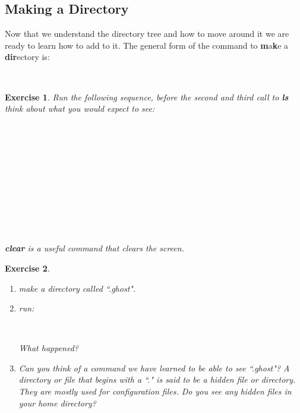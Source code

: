 \documentclass[oneside]{book}
\newcommand{\commandline}[1]{\begin{center} \colorbox{Dark}{\textcolor{white}{#1}} \end{center}}
\newtheorem{ex}{Exercise}[chapter]
\begin{document}
\subsection{Making a Directory}
Now that we understand the directory tree and how to move around it we are ready to learn how to add to it. The general form of the command to \textbf{m}a\textbf{k}e a \textbf{dir}ectory is:
\commandline{mkdir newdirname1 newdirname2 ...}
\begin{ex}
	Run the following sequence, before the second and third call to \textbf{ls} think about what you would expect to see:
\commandline{clear}
\commandline{ls}
\commandline{mkdir FirstDir SecondDir}
\commandline{ls}
\commandline{mkdir FirstDir/Foo FirstDir/Foo2}
\commandline{ls FirstDir}
\textbf{clear} is a useful command that clears the screen.
\end{ex}
\begin{ex}
\
	\begin{enumerate} 
			\item make a directory called ``.ghost".
			\item run:
				\commandline{ls}
				What happened?
			\item Can you think of a command we have learned to be able to see ``.ghost"? A directory or file that begins with a ``." is said to be a hidden file or directory. They are mostly used for configuration files. Do you see any hidden files in your home directory?
	\end{enumerate}
\end{ex}
\end{document}

